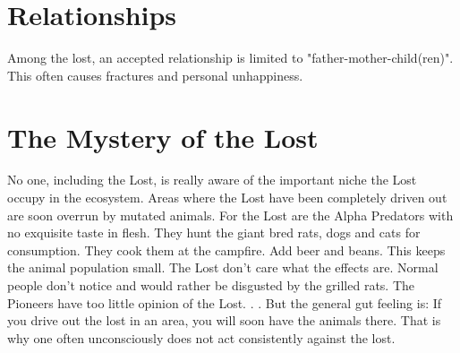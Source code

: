\section{Relationships}
Among the lost, an accepted relationship is limited to "father-mother-child(ren)". This often causes fractures and personal unhappiness.

\section{The Mystery of the Lost}
No one, including the Lost, is really aware of the important niche the Lost occupy in the ecosystem. Areas where the Lost have been completely driven out are soon overrun by mutated animals.
For the Lost are the Alpha Predators with no exquisite taste in flesh. They hunt the giant bred rats, dogs and cats for consumption. They cook them at the campfire. Add beer and beans.
This keeps the animal population small. The Lost don't care what the effects are. Normal people don't notice and would rather be disgusted by the grilled rats. The Pioneers have too little opinion of the Lost. . .
But the general gut feeling is: If you drive out the lost in an area, you will soon have the animals there.
That is why one often unconsciously does not act consistently against the lost.